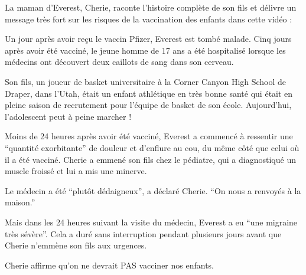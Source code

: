 La maman d'Everest, Cherie, raconte l'histoire complète de son fils et délivre
un message très fort sur les risques de la vaccination des enfants dans cette
vidéo :

Un jour après avoir reçu le vaccin Pfizer, Everest est tombé malade. Cinq jours
après avoir été vacciné, le jeune homme de 17 ans a été hospitalisé lorsque les
médecins ont découvert deux caillots de sang dans son cerveau.

Son fils, un joueur de basket universitaire à la Corner Canyon High School de
Draper, dans l'Utah, était un enfant athlétique en très bonne santé qui était en
pleine saison de recrutement pour l'équipe de basket de son école. Aujourd'hui,
l'adolescent peut à peine marcher !

Moins de 24 heures après avoir été vacciné, Everest a commencé à ressentir une
``quantité exorbitante'' de douleur et d'enflure au cou, du même côté que celui
où il a été vacciné. Cherie a emmené son fils chez le pédiatre, qui a
diagnostiqué un muscle froissé et lui a mis une minerve.

Le médecin a été ``plutôt dédaigneux'', a déclaré Cherie. ``On nous a renvoyés à
la maison.''

Mais dans les 24 heures suivant la visite du médecin, Everest a eu ``une
migraine très sévère''. Cela a duré sans interruption pendant plusieurs jours
avant que Cherie n'emmène son fils aux urgences.

Cherie affirme qu'on ne devrait PAS vacciner nos enfants.
